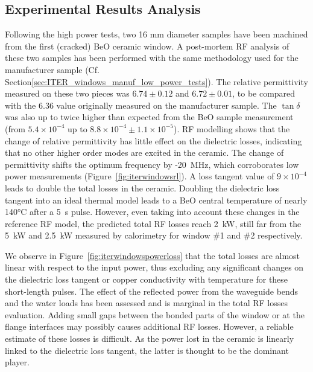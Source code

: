 \subsection{Experimental Results Analysis}

Following the high power tests, two 16 mm diameter samples have been machined from the first (cracked) BeO ceramic window. A post-mortem RF analysis of these two samples has been performed with the same methodology used for the manufacturer sample (Cf. Section\ref{sec:ITER_windows_manuf_low_power_tests}). The relative permittivity measured on these two pieces was $6.74\pm0.12$ and $6.72\pm0.01$, to be compared with the 6.36 value originally measured on the manufacturer sample. The $\tan \delta$ was also up to twice higher than expected from the BeO sample measurement (from $5.4\times10^{-4}$ up to $8.8\times10^{-4} \pm 1.1\times 10^{-5}$). RF modelling shows that the change of relative permittivity has little effect on the dielectric losses, indicating that no other higher order modes are excited in the ceramic. The change of permittivity shifts the optimum frequency by -20~MHz, which corroborates low power measurements (Figure~\ref{fig:iterwindowsrl}). A loss tangent value of $9\times10^{-4}$ leads to double the total losses in the ceramic. Doubling the dielectric loss tangent into an ideal thermal model leads to a BeO central temperature of nearly 140$\si{\degreeCelsius}$ after a 5~s pulse. However, even taking into account these changes in the reference RF model, the predicted total RF losses reach 2~kW, still far from the 5~kW and 2.5~kW measured by calorimetry for window \#1 and \#2 respectively. 

We observe in Figure~\ref{fig:iterwindowspowerloss} that the total losses are almost linear with respect to the input power, thus excluding any significant changes on the dielectric loss tangent or copper conductivity with temperature for these short-length pulses.  The effect of the reflected power from the waveguide bends and the water loads has been assessed and is marginal in the total RF losses evaluation. Adding small gaps between the bonded parts of the window or at the flange interfaces may possibly causes additional RF losses. However, a reliable estimate of these losses is difficult. As the power lost in the ceramic is linearly linked to the dielectric loss tangent, the latter is thought to be the dominant player.

